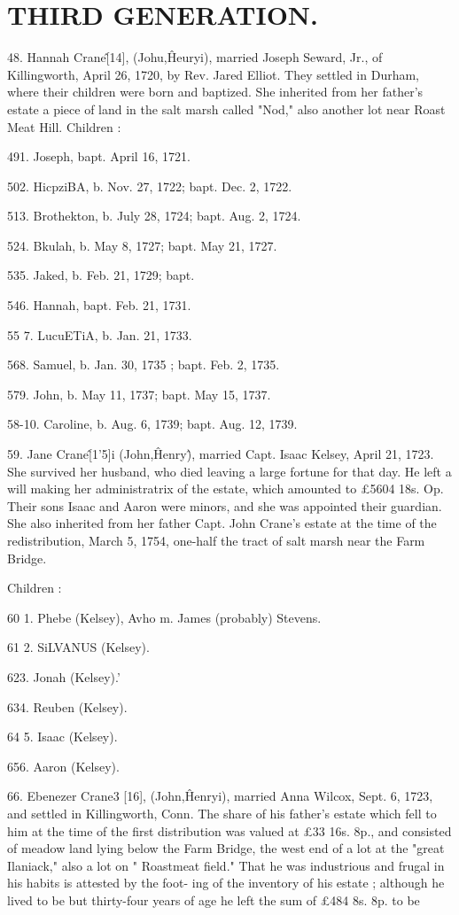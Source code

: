 \documentclass{book}
\begin{document}
\section{THIRD GENERATION.}


48. Hannah Crane\^ [14], (Johu,\^ Heuryi), married Joseph 
Seward, Jr., of Killingworth, April 26, 1720, by Rev. Jared 
Elliot. They settled in Durham, where their children were born 
and baptized. She inherited from her father's estate a piece of 
land in the salt marsh called "Nod," also another lot near Roast 
Meat Hill. Children : 

491. Joseph, bapt. April 16, 1721. 

502. HicpziBA, b. Nov. 27, 1722; bapt. Dec. 2, 1722. 

 513. Brothekton, b. July 28, 1724; bapt. Aug. 2, 1724. 

524. Bkulah, b. May 8, 1727; bapt. May 21, 1727. 

535. Jaked, b. Feb. 21, 1729; bapt. 

546. Hannah, bapt. Feb. 21, 1731. 

55  7. LucuETiA, b. Jan. 21, 1733. 

568. Samuel, b. Jan. 30, 1735 ; bapt. Feb. 2, 1735. 

579. John, b. May 11, 1737; bapt. May 15, 1737. 

58-10. Caroline, b. Aug. 6, 1739; bapt. Aug. 12, 1739. 

59. Jane Crane\^ [1'5]i (John,\^ Henry\^), married Capt. Isaac 
Kelsey, April 21, 1723. She survived her husband, who died 
leaving a large fortune for that day. He left a will making her 
administratrix of the estate, which amounted to £5604  18s.  Op. 
Their sons Isaac and Aaron were minors, and she was appointed 
their guardian. She also inherited from her father Capt. John 
Crane's estate at the time of the redistribution, March 5, 1754, 
one-half the tract of salt marsh near the Farm Bridge. 

Children : 

60  1. Phebe (Kelsey), Avho m. James (probably) Stevens. 

61  2. SiLVANUS (Kelsey). 

623. Jonah (Kelsey).' 

634. Reuben (Kelsey). 

64  5. Isaac (Kelsey). 

656. Aaron (Kelsey). 

66. Ebenezer Crane3 [16], (John,\^ Henryi), married Anna 
Wilcox, Sept. 6, 1723, and settled in Killingworth, Conn. The 
share of his father's estate which fell to him at the time of the 
first distribution was valued at £33  16s.  8p., and consisted of 
meadow land lying below the Farm Bridge, the west end of a lot 
at the "great Ilaniack," also a lot on " Roastmeat field." That 
he was industrious and frugal in his habits is attested by the foot- 
ing of the inventory of his estate ; although he lived to be but 
thirty-four years of age he left the sum of £484  8s.  8p. to be 
\end{document}
